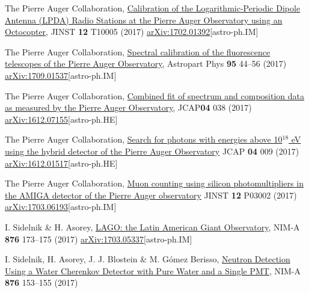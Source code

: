 \begin{etaremune}
\item {}The Pierre Auger Collaboration, \href{https://doi.org/10.1088/1748-0221/12/10/T10005}{{Calibration of the Logarithmic-Periodic Dipole Antenna (LPDA) Radio Stations at the Pierre Auger Observatory using an Octocopter}}, JINST {\bf{12}} T10005 (2017) \href{http://arxiv.org/abs/1702.01392}{arXiv:1702.01392}[astro-ph.IM]

\item {}The Pierre Auger Collaboration, \href{https://doi.org/10.1016/j.astropartphys.2017.09.001}{{Spectral calibration of the fluorescence telescopes of the Pierre Auger Observatory}}, Astropart Phys {\bf{95}} 44--56 (2017) \href{https://arxiv.org/abs/1709.01537}{arXiv:1709.01537}[astro-ph.IM]

\item {}The Pierre Auger Collaboration, \href{https://doi.org/10.1088/1475-7516/2017/04/038}{{Combined fit of spectrum and composition data as measured by the Pierre Auger Observatory}}, JCAP{\bf{04}} 038 (2017) \href{http://arxiv.org/abs/1612.07155}{arXiv:1612.07155}[astro-ph.HE]

\item {}The Pierre Auger Collaboration, \href{https://doi.org/10.1088/1475-7516/2017/04/009}{{Search for photons with energies above 10$^{18}$ eV using the hybrid detector of the Pierre Auger Observatory}} JCAP {\bf{04}} 009 (2017) \href{http://arxiv.org/abs/1612.01517}{arXiv:1612.01517}[astro-ph.HE]

\item {}The Pierre Auger Collaboration, \href{https://doi.org/10.1088/1748-0221/12/03/P03002}{{Muon counting using silicon photomultipliers in the AMIGA detector of the Pierre Auger observatory}} JINST {\bf 12} P03002 (2017) \href{http://arxiv.org/abs/1703.06193}{arXiv:1703.06193}[astro-ph.IM]

\item {}I. Sidelnik \& H. Asorey, \href{https://doi.org/10.1016/j.nima.2017.02.069}{{LAGO: the Latin American Giant Observatory}}, NIM-A {\bf{876}} 173--175 (2017) \href{http://arxiv.org/abs/1703.05337}{arXiv:1703.05337}[astro-ph.IM]

\item {} I. Sidelnik, H. Asorey, J. J. Blostein \& M. Gómez Berisso, \href{https://doi.org/10.1016/j.nima.2017.02.048}{{Neutron Detection Using a Water Cherenkov Detector with Pure Water and a Single PMT}}, NIM-A {\bf{876}} 153--155 (2017)


\end{etaremune}
